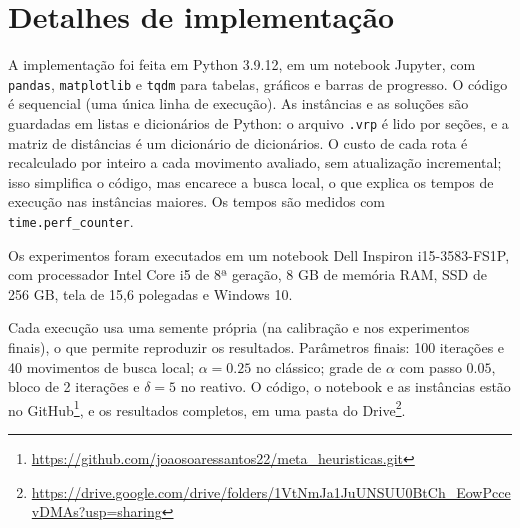 \section{Detalhes de implementação}

A implementação foi feita em Python 3.9.12, em um notebook Jupyter, com \texttt{pandas}, \texttt{matplotlib} e \texttt{tqdm} para tabelas, gráficos e barras de progresso. O código é sequencial (uma única linha de execução). As instâncias e as soluções são guardadas em listas e dicionários de Python: o arquivo \texttt{.vrp} é lido por seções, e a matriz de distâncias é um dicionário de dicionários. O custo de cada rota é recalculado por inteiro a cada movimento avaliado, sem atualização incremental; isso simplifica o código, mas encarece a busca local, o que explica os tempos de execução nas instâncias maiores. Os tempos são medidos com \texttt{time.perf\_counter}.

Os experimentos foram executados em um notebook Dell Inspiron i15-3583-FS1P, com processador Intel Core i5 de 8ª geração, 8 GB de memória RAM, SSD de 256 GB, tela de 15,6 polegadas e Windows 10.

Cada execução usa uma semente própria (na calibração e nos experimentos finais), o que permite reproduzir os resultados. Parâmetros finais: 100 iterações e 40 movimentos de busca local; $\alpha=0.25$ no clássico; grade de $\alpha$ com passo $0.05$, bloco de 2 iterações e $\delta=5$ no reativo. O código, o notebook e as instâncias estão no GitHub\footnote{\url{https://github.com/joaosoaressantos22/meta_heuristicas.git}}, e os resultados completos, em uma pasta do Drive\footnote{\url{https://drive.google.com/drive/folders/1VtNmJa1JuUNSUU0BtCh_EowPccevDMAs?usp=sharing}}.
